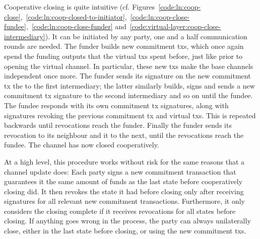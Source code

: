   Cooperative closing is quite intuitive (cf.
  Figures~\ref{code:ln:coop-close},~\ref{code:ln:coop-closed-to-initiator},~\ref{code:ln:coop-close-fundee},~\ref{code:ln:coop-close-funder}
  and~\ref{code:virtual-layer:coop-close-intermediary}). It can be initiated by
  any party, one and a half communication rounds are needed. The funder builds
  new commitment txs, which once again spend the funding outputs that the
  virtual txs spent before, just like prior to opening the virtual channel. In
  particular, these new txs make the base channels independent once more. The
  funder sends
  its signature on the new commitment tx the to the first intermediary; the
  latter similarly builds, signs and sends a new commitment tx signature to the
  second intermediary and so on until the fundee. The fundee
  responds with its own commitment tx signatures, along with signatures revoking
  the previous commitment tx and virtual txs. This is repeated backwards until
  revocations reach the funder. Finally the funder sends its revocation to its
  neighbour and it to the next, until the revocations reach the fundee. The
  channel has now closed cooperatively.

  At a high level, this procedure works without risk for the same reasons that a
  channel update does: Each party signs a new commitment transaction that
  guarantees it the same amount of funds as the last state before cooperatively
  closing did. It then revokes the state it had before closing only after
  receiving signatures for all relevant new commitment transactions.
  Furthermore, it only considers the closing complete if it receives revocations
  for all states before closing. If anything goes wrong in the process, the
  party can always unilaterally close, either in the last state before closing,
  or using the new commitment txs.

